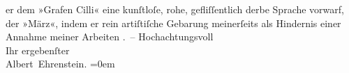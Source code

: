 \begin{ledgroupsized}[t]{13cm}
               er dem »Grafen Cilli« eine kunſtloſe, rohe,
               gefliſſentlich derbe Sprache vorwarf, der »März«,
               indem er rein artiſtiſche Gebarung meinerſeits als Hindernis einer Annahme meiner
               Arbeiten \label{K_L01948_2v}\label{K_L01948_2h}. –\pend
           \pstart
           Hochachtungsvoll{\\[\baselineskip]}Ihr ergebenſter{\\[\baselineskip]}\spacefill\mbox{Albert Ehrenstein.}\pend
           \leftskip=0em{}
         
         \endnumbering{}\end{ledgroupsized}  \newcommand{\dateiname}{L01948}\newcommand{\titel}{Albert Ehrenstein an Arthur Schnitzler, 18. 7. 1910}\newcommand{\editorInnen}{Martin Anton Müller und Gerd-Hermann Susen}
      